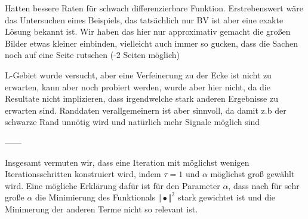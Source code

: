 Hatten bessere Raten für schwach differenzierbare Funktion. Erstrebenswert
wäre das Untersuchen eines Beispiels, das tatsächlich nur BV ist aber
eine exakte Lösung bekannt ist. Wir haben das hier nur approximativ gemacht
die großen Bilder etwas kleiner einbinden, vielleicht auch immer so gucken,
dass die Sachen noch auf eine Seite rutschen (-2 Seiten möglich)

\medskip

L-Gebiet wurde versucht, aber eine Verfeinerung zu der Ecke ist nicht zu erwarten,
kann aber noch probiert werden, wurde aber hier nicht, da die Resultate nicht 
implizieren, dass irgendwelche stark anderen Ergebnisse zu erwarten sind.
Randdaten verallgemeinern ist aber sinnvoll, da damit z.b der schwarze Rand
unnötig wird und natürlich mehr Signale möglich sind

------

Insgesamt vermuten wir, dass eine Iteration mit möglichst wenigen
Iterationsschritten konstruiert wird, indem $\tau=1$ und $\alpha$ möglichst
groß gewählt wird.
Eine mögliche Erklärung dafür ist für den Parameter $\alpha$, dass
nach  für sehr große $\alpha$ die Minimierung
des Funktionals $\Vert\bullet\Vert^2$ stark gewichtet ist und die 
Minimerung der anderen Terme nicht so relevant ist.
